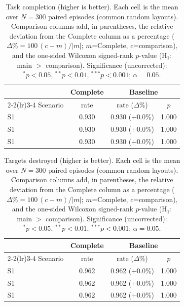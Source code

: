 
\begin{table}[ht]
  \centering
  \caption{Task completion (higher is better). Each cell is the mean over $N=300$ paired episodes (common random layouts). Comparison columns add, in parentheses, the relative deviation from the Complete column as a percentage ($\Delta\%=100\,(c-m)/|m|$; $m$=Complete, $c$=comparison), and the one-sided Wilcoxon signed-rank $p$-value (H$_1$: main $>$ comparison). Significance (uncorrected): $^{*}p<0.05$, $^{**}p<0.01$, $^{***}p<0.001$; $\alpha=0.05$.}
  \label{tab:wilcoxon-completion}
  \small
  \begin{tabular}{l c cc}
    \toprule
     & Complete & \multicolumn{2}{c}{Baseline} \\
    \cmidrule(lr){2-2}\cmidrule(lr){3-4}
    Scenario & {rate} & {rate ($\Delta$\%)} & {$p$} \\
    \midrule
    S1 & 0.930 & 0.930 (+0.0\%) & 1.000 \\
    S1 & 0.930 & 0.930 (+0.0\%) & 1.000 \\
    S1 & 0.930 & 0.930 (+0.0\%) & 1.000 \\
    \bottomrule
  \end{tabular}
\end{table}

\begin{table}[ht]
  \centering
  \caption{Targets destroyed (higher is better). Each cell is the mean over $N=300$ paired episodes (common random layouts). Comparison columns add, in parentheses, the relative deviation from the Complete column as a percentage ($\Delta\%=100\,(c-m)/|m|$; $m$=Complete, $c$=comparison), and the one-sided Wilcoxon signed-rank $p$-value (H$_1$: main $>$ comparison). Significance (uncorrected): $^{*}p<0.05$, $^{**}p<0.01$, $^{***}p<0.001$; $\alpha=0.05$.}
  \label{tab:wilcoxon-targets}
  \small
  \begin{tabular}{l c cc}
    \toprule
     & Complete & \multicolumn{2}{c}{Baseline} \\
    \cmidrule(lr){2-2}\cmidrule(lr){3-4}
    Scenario & {rate} & {rate ($\Delta$\%)} & {$p$} \\
    \midrule
    S1 & 0.962 & 0.962 (+0.0\%) & 1.000 \\
    S1 & 0.962 & 0.962 (+0.0\%) & 1.000 \\
    S1 & 0.962 & 0.962 (+0.0\%) & 1.000 \\
    \bottomrule
  \end{tabular}
\end{table}

